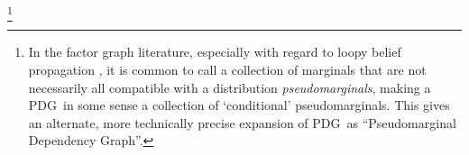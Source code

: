 \documentclass{article}
\newcommand{\commentout}[1]{\ignorespaces}
\newcommand{\vfullfootnote}[1]{}
\renewcommand{\vfullfootnote}[1]{\footnote{#1}}
\newcommand{\Ed}{\mathcal E}
\newcommand{\MN}{PDG}
\numberwithin{equation}{section}
\begin{document}
\begin{notfocus}
	
	\vfullfootnote{In the factor graph literature, especially with regard to loopy belief propagation \parencite{wainwright2008graphical}, it is common to call a collection of marginals that are not necessarily all compatible with a distribution \emph{pseudomarginals}, making a \MN\ in some sense a collection of `conditional' pseudomarginals. This gives an alternate, more technically precise expansion of \MN\ as ``Pseudomarginal Dependency Graph''.}




\commentout{\subsection{NOTATION AND GRAPH OPERATIONS}

}
\end{notfocus}
\end{document}
